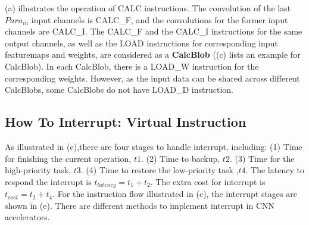 (a) illustrates the operation of CALC instructions. The convolution of the last $ Para_{in} $ input channels is CALC\_F, and the convolutions for the former input channels are CALC\_I. The CALC\_F and the CALC\_I instructions for the same output channels, as well as the LOAD instructions for corresponding input featuremaps and weights, are considered as a \textbf{CalcBlob}  ((c) lists an example for CalcBlob). In each CalcBlob, there is a LOAD\_W instruction for the corresponding weights. However, as the input data can be shared across different CalcBlobs, some CalcBlobs do not have  LOAD\_D instruction. 








\subsection{How To Interrupt: Virtual Instruction}
\label{sec:howinter}

As illustrated in (e),there are four stages to handle interrupt, including: (1) Time for finishing the current operation, $t1$. (2) Time to backup, $t2$. (3) Time for the high-priority task, $t3$. (4) Time to restore the low-priority task ,$t4$. 
The latency to respond the interrupt is $t_{latency} = t_1+t_2$. The extra cost for interrupt is $t_{cost}=t_2+t_4$. For the instruction flow illustrated in (c), the interrupt stages are shown in (e).
There are different methods to implement interrupt in CNN accelerators.

